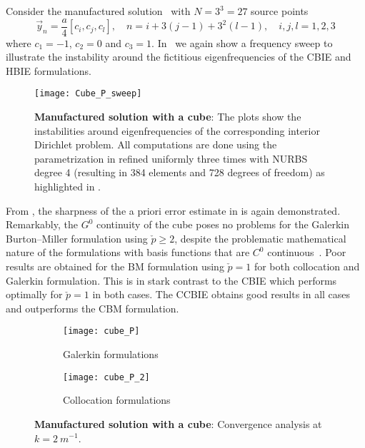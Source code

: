 Consider the manufactured solution~ with $N=3^3=27$ source points 
\begin{equation*}
	\vec{y}_n = \frac{a}{4}[c_i, c_j, c_l],\quad n=i+3(j-1)+3^2(l-1),\quad i,j,l=1,2,3
\end{equation*}
where $c_1=-1$, $c_2=0$ and $c_3=1$. In~ we again show a frequency sweep to illustrate the instability around the fictitious eigenfrequencies of the CBIE and HBIE formulations.
\begin{figure}
	\centering
	\texttt{[image: Cube\_P\_sweep]}
	\caption{\textbf{Manufactured solution with a cube}: The plots show the instabilities around eigenfrequencies of the corresponding interior Dirichlet problem. All computations are done using the parametrization in  refined uniformly three times with NURBS degree 4 (resulting in 384 elements and 728 degrees of freedom) as highlighted in .}
	\label{Fig3:Cube_P_sweep}
\end{figure}
From , the sharpness of the a priori error estimate in  is again demonstrated. Remarkably, the $G^0$ continuity of the cube poses no problems for the Galerkin Burton--Miller formulation using $\check{p}\geq 2$, despite the problematic mathematical nature of the formulations with basis functions that are $C^0$ continuous~\cite{Liu1999anf}. Poor results are obtained for the BM formulation using $\check{p}=1$ for both collocation and Galerkin formulation. This is in stark contrast to the CBIE which performs optimally for $\check{p}=1$ in both cases. The CCBIE obtains good results in all cases and outperforms the CBM formulation.
\begin{figure}
	\centering
	\begin{subfigure}[t]{\textwidth}
		\texttt{[image: cube\_P]}
		\caption{Galerkin formulations}
		\label{Fig3:Cube_P1}
	\end{subfigure} 
	\par\bigskip
	\par\bigskip
	\begin{subfigure}[t]{\textwidth}
		\texttt{[image: cube\_P\_2]}
		\caption{Collocation formulations}
		\label{Fig3:Cube_P2}
	\end{subfigure} 
	\caption{\textbf{Manufactured solution with a cube}: Convergence analysis at $k=\SI{2}{m^{-1}}$.}
	\label{Fig3:Cube_P}
\end{figure}

